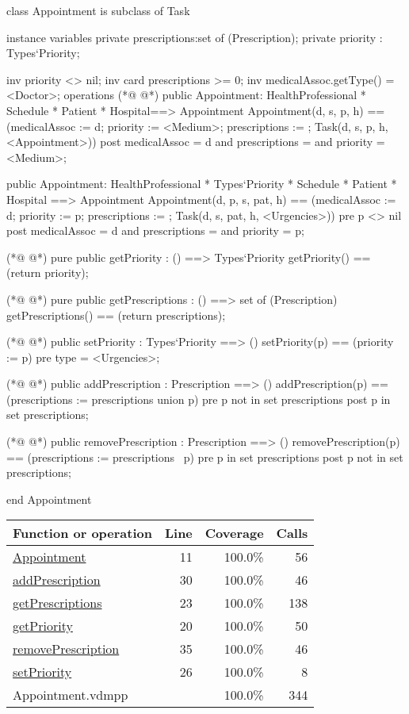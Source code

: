 \begin{vdmpp}[breaklines=true]
class Appointment is subclass of Task

instance variables
  private prescriptions:set of (Prescription);
  private priority : Types`Priority;
  
  inv priority <> nil;
  inv card prescriptions >= 0;
  inv medicalAssoc.getType() = <Doctor>;
operations
(*@
\label{Appointment:11}
@*)
 public Appointment: HealthProfessional * Schedule * Patient * Hospital==> Appointment
  Appointment(d, s, p, h) == (medicalAssoc := d; priority := <Medium>; prescriptions := {}; Task(d, s, p, h, <Appointment>))
 post medicalAssoc = d and prescriptions = {} and priority = <Medium>;
 
 public Appointment: HealthProfessional * Types`Priority * Schedule * Patient * Hospital ==> Appointment
  Appointment(d, p, s, pat, h) == (medicalAssoc := d; priority := p; prescriptions := {}; Task(d, s, pat, h, <Urgencies>))
 pre p <> nil
 post medicalAssoc = d and prescriptions = {} and priority = p;

(*@
\label{getPriority:20}
@*)
 pure public getPriority : () ==> Types`Priority
  getPriority() == (return priority);
 
(*@
\label{getPrescriptions:23}
@*)
  pure public getPrescriptions : () ==> set of (Prescription)
   getPrescriptions() == (return prescriptions);
  
(*@
\label{setPriority:26}
@*)
  public setPriority : Types`Priority ==> ()
   setPriority(p) == (priority := p)
  pre type = <Urgencies>;
  
(*@
\label{addPrescription:30}
@*)
  public addPrescription : Prescription ==> ()
   addPrescription(p) == (prescriptions := prescriptions union {p})
  pre p not in set prescriptions
  post p in set prescriptions;
                 
(*@
\label{removePrescription:35}
@*)
 public removePrescription : Prescription ==> ()
   removePrescription(p) == (prescriptions := prescriptions \ {p})
  pre p in set prescriptions
  post p not in set prescriptions;
   
end Appointment
\end{vdmpp}
\bigskip
\begin{longtable}{|l|r|r|r|}
\hline
Function or operation & Line & Coverage & Calls \\
\hline
\hline
\hyperref[Appointment:11]{Appointment} & 11&100.0\% & 56 \\
\hline
\hyperref[addPrescription:30]{addPrescription} & 30&100.0\% & 46 \\
\hline
\hyperref[getPrescriptions:23]{getPrescriptions} & 23&100.0\% & 138 \\
\hline
\hyperref[getPriority:20]{getPriority} & 20&100.0\% & 50 \\
\hline
\hyperref[removePrescription:35]{removePrescription} & 35&100.0\% & 46 \\
\hline
\hyperref[setPriority:26]{setPriority} & 26&100.0\% & 8 \\
\hline
\hline
Appointment.vdmpp & & 100.0\% & 344 \\
\hline
\end{longtable}

